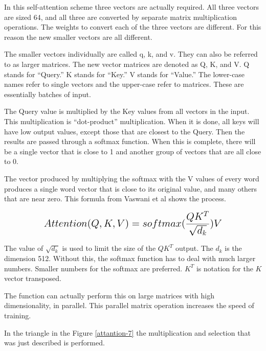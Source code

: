In this self-attention scheme three vectors are actually required. All three vectors are sized 64, and all three are converted by separate matrix multiplication operations. The weights to convert each of the three vectors are different. For this reason the new smaller vectors are all different.

The smaller vectors individually are called q, k, and v. They can also be referred to as larger matrices. The new vector matrices are denoted as Q, K, and V. Q stands for ``Query.'' K stands for ``Key.'' V stands for ``Value.'' The lower-case names refer to single vectors and the upper-case refer to matrices. These are essentially batches of input.

The Query value is multiplied by the Key values from all vectors in the input. This multiplication is ``dot-product'' multiplication. When it is done, all keys will have low output values, except those that are closest to the Query. Then the results are passed through a softmax function. When this is complete, there will be a single vector that is close to 1 and another group of vectors that are all close to 0.

The vector produced by multiplying the softmax with the V values of every word produces a single word vector that is close to its original value, and many others that are near zero. This formula from Vaswani et al \cite{Vaswani2017AttentionIA} shows the process.

$$
\mathlarger{ \mathlarger{
Attention(Q,K,V)=softmax(\dfrac{QK^T}{\sqrt{d_k}})V
} }
$$

The value of $\sqrt{d_k}$ is used to limit the size of the $QK^T$ output. The $d_k$ is the dimension 512. Without this, the softmax function has to deal with much larger numbers. Smaller numbers for the softmax are preferred. $K^T$ is notation for the $K$ vector transposed.

The function can actually perform this on large matrices with high dimensionality, in parallel. This parallel matrix operation increases the speed of training.

In the triangle in the Figure \ref{attantion-7} the multiplication and selection that was just described is performed.

